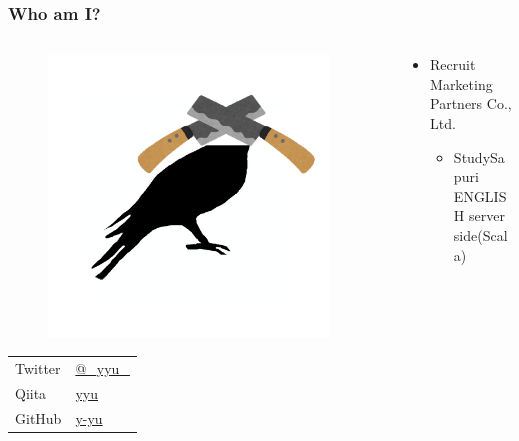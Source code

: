 \begin{frame}
  \frametitle{Who am I?}
  
  \begin{columns}
    \begin{column}{0.3\textwidth}
      \begin{center}
        \begin{figure}[h]
          \includegraphics[width=0.95\textwidth]{img/bird2x.png}%
        \end{figure}
      \end{center}
 
      \begin{table}[h]
        \begin{tabular}{ll}
          Twitter & \href{https://twitter.com/\_yyu\_}{@\_yyu\_} \\
          Qiita &  \href{https://qiita.com/yyu}{yyu} \\
          GitHub &  \href{https://github.com/y-yu}{y-yu} \\
        \end{tabular}
      \end{table}
    \end{column}
    \begin{column}{0.7\textwidth}
      \pause
      \begin{itemize}
        \item Recruit Marketing Partners Co., Ltd.
        \begin{itemize}
          \item StudySapuri ENGLISH server side(Scala)
        \end{itemize}


\end{itemize}
\end{column}
\end{columns}
\end{frame}
